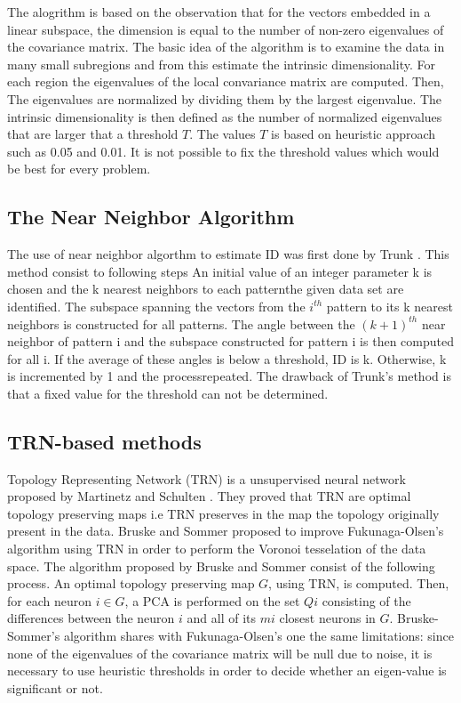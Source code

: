 \documentclass[journal]{IEEEtran}
\begin{document}
The alogrithm is based on the observation that for the vectors embedded in a linear subspace, 
the dimension is equal to the number of non-zero eigenvalues of the covariance matrix. 
The basic idea of the algorithm is to examine the data in many small subregions and from this estimate 
the intrinsic dimensionality. For each region the eigenvalues of the local convariance matrix are computed. 
Then, The eigenvalues are normalized by dividing them by the largest eigenvalue. The intrinsic dimensionality is 
then defined as the number of normalized eigenvalues that are larger that a threshold \(T\). The values \(T\) is 
based on heuristic approach such as 0.05 and 0.01. It is not possible to fix the threshold values which would be best 
for every problem.


\subsection{The Near Neighbor Algorithm}

The use of near neighbor algorthm to estimate ID was first done by Trunk \cite{Trunk76}. This method consist to following steps
An initial value of an integer parameter k is chosen and the k nearest neighbors to each patternthe given data set are identified. 
The subspace spanning the vectors from the \(i^{th}\) pattern to its k nearest neighbors is constructed for all patterns.
The angle between the \((k + 1)^{th}\) near neighbor of pattern i and the subspace constructed
for pattern i is then computed for all i. If the average of these angles is below
a threshold, ID is k. Otherwise, k is incremented by 1 and the processrepeated. 
The drawback of Trunk's method is that a fixed value for the threshold can not be determined.

\subsection{TRN-based methods}

Topology Representing Network (TRN) is a unsupervised neural network proposed by Martinetz and Schulten \cite{Martinetz94}. 
They proved that TRN are optimal topology preserving maps i.e TRN preserves in the map the topology originally present in the data.
Bruske and Sommer \cite{Bruske98} proposed to improve Fukunaga-Olsen’s algorithm using TRN in order to perform the Voronoi tesselation of the data space. 
The algorithm proposed by Bruske and Sommer consist of the following process. An optimal topology preserving map \(G\), using TRN, is computed. 
Then, for each neuron \(i \in G\), a PCA is performed on the set \(Qi\) consisting of the differences between the neuron \(i\) and all of 
its \(mi\) closest neurons in \(G\). Bruske-Sommer’s algorithm shares with Fukunaga-Olsen’s one the same limitations: 
since none of the eigenvalues of the covariance matrix will be null due to noise, it is necessary to use heuristic thresholds 
in order to decide whether an eigen-value is significant or not.
\end{document}
